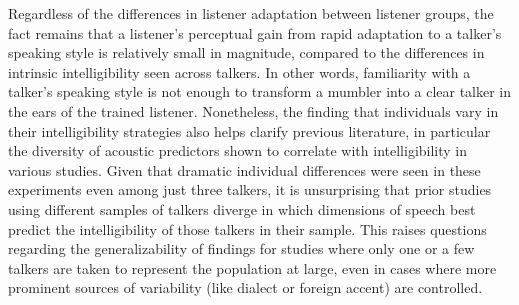 Regardless of the differences in listener adaptation between listener groups, the fact remains that a listener’s perceptual gain from rapid adaptation to a talker’s speaking style is relatively small in magnitude, compared to the differences in intrinsic intelligibility seen across talkers.  In other words, familiarity with a talker’s speaking style is not enough to transform a mumbler into a clear talker in the ears of the trained listener.  
Nonetheless, the finding that individuals vary in their intelligibility strategies also helps clarify previous literature, in particular the diversity of acoustic predictors shown to correlate with intelligibility in various studies.  Given that dramatic individual differences were seen in these experiments even among just three talkers, it is unsurprising that prior studies using different samples of talkers diverge in which dimensions of speech best predict the intelligibility of those talkers in their sample.  This raises questions regarding the generalizability of findings for studies where only one or a few talkers are taken to represent the population at large, even in cases where more prominent sources of variability (like dialect or foreign accent) are controlled.

